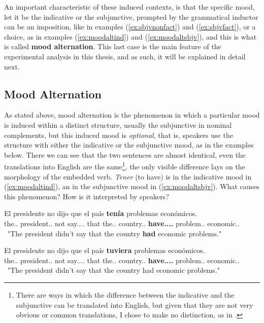 An important characteristic of these induced contexts, is that the specific mood, let it be the indicative or the subjunctive, prompted by the grammatical inductor can be an imposition, like in examples (\ref{ex:sbjvnonfact}) and (\ref{ex:sbjvfact}), or a choice, as in examples (\ref{ex:moodaltind}) and (\ref{ex:moodaltsbjv}), and this is what is called \textbf{mood alternation}. This last case is the main feature of the experimental analysis in this thesis, and as such, it will be explained in detail next.\\ 

\subsection{Mood Alternation}
\label{subsect:moodalt}

As stated above, mood alternation is the phenomenon in which a particular mood is induced within a distinct structure, usually the subjunctive in nominal complements, but this induced mood is \textit{optional}, that is, speakers use the structure with either the indicative or the subjunctive mood, as in the examples below. There we can see that the two sentences are almost identical, even the translations into English are the same\footnote{There are ways in which the difference between the indicative and the subjunctive can be translated into English, but given that they are not very obvious or common translations, I chose to make no distinction, as in \citet{faulkner2021systematic}.}, the only visible difference lays on the morphology of the embedded verb. \textit{Tener} (to have) is in the indicative mood in (\ref{ex:moodaltind}), an in the subjunctive mood in (\ref{ex:moodaltsbjv}). What causes this phenomenon? How is it interpreted by speakers?\\

\begin{exe}
  \ex
    \begin{xlist}
      \item  {\gll El presidente no dijo que el país \textbf{tenía} problemas económicos.\\ the.\M.\Sg{} president.\M.\Sg{} not say.\Pst.\Pfv.\Ind.\Tsg{} that the.\M.\Sg{} country.\M.\Sg{} \textbf{have.\Pst.\Ipfv.\Ind.\Tsg{}} problem.\M.\Pl{} economic.\M.\Pl{} \\\ "The president didn't say that the country \textbf{had} economic problems."\glt }\label{ex:moodaltind}
      \item {\gll El presidente no dijo que el país \textbf{tuviera} problemas económicos.\\   the.\M.\Sg{} president.\M.\Sg{} not say.\Pst.\Pfv.\Ind.\Tsg{} that the.\M.\Sg{} country.\M.\Sg{} \textbf{have.\Pst.\Ipfv.\Sbjv.\Tsg{}} problem.\M.\Pl{} economic.\M.\Pl{} \\\ "The president didn't say that the country had economic problems."\glt }\label{ex:moodaltsbjv}
    \end{xlist}
\end{exe}

